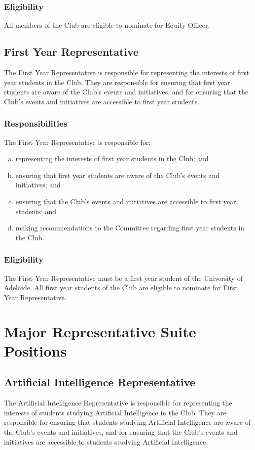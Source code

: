 \documentclass[11pt]{report}
\begin{document}
\subsection{Eligibility}
All members of the Club are eligible to nominate for Equity Officer.

\section{First Year Representative}
The First Year Representative is responsible for representing the interests of first year students in the Club. They are responsible for ensuring that first year students are aware of the Club's events and initiatives, and for ensuring that the Club's events and initiatives are accessible to first year students.
\subsection{Responsibilities}
The First Year Representative is responsible for:
\begin{enumerate}[(a)]
    \item representing the interests of first year students in the Club; and
    \item ensuring that first year students are aware of the Club's events and initiatives; and
    \item ensuring that the Club's events and initiatives are accessible to first year students; and
    \item making recommendations to the Committee regarding first year students in the Club.
\end{enumerate}
\subsection{Eligibility}
The First Year Representative must be a first year student of the University of Adelaide. All first year students of the Club are eligible to nominate for First Year Representative.

\chapter{Major Representative Suite Positions}
\section{Artificial Intelligence Representative}
The Artificial Intelligence Representative is responsible for representing the interests of students studying Artificial Intelligence in the Club. They are responsible for ensuring that students studying Artificial Intelligence are aware of the Club's events and initiatives, and for ensuring that the Club's events and initiatives are accessible to students studying Artificial Intelligence.
\end{document}
